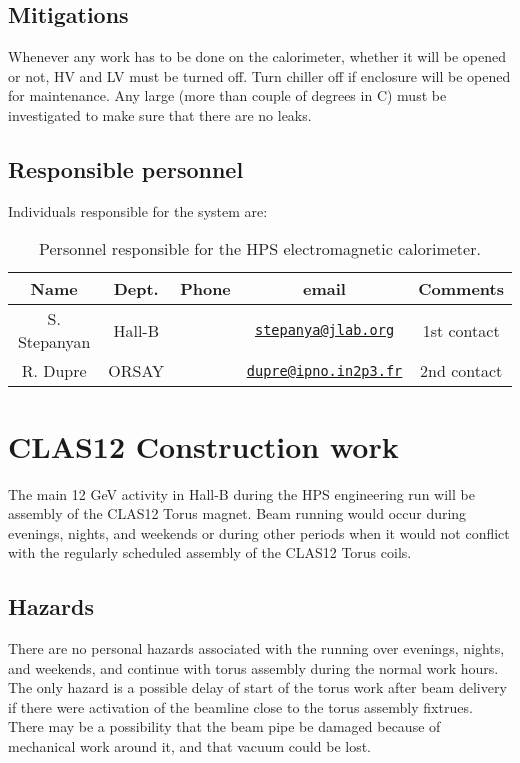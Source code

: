 \documentclass[11pt]{report}
\begin{document}
\subsection{Mitigations}
\indent

Whenever any work has to be done on the calorimeter, whether it will be opened or not, HV and LV must be turned off. Turn chiller off if enclosure will be opened for maintenance. Any large (more than couple of degrees in C) must be investigated to make sure that there are no leaks.   

\subsection{Responsible personnel}
\indent

Individuals responsible for the system are:

\begin{table}[!htb]
 \centering
 \begin{tabular}{|c|c|c|c|c|}
\hline
 Name&Dept.&Phone&email&Comments \\ \hline
 S. Stepanyan & Hall-B&&\href{mailto:stepanya@jlab.org}{\nolinkurl{stepanya@jlab.org}}&1st contact \\ \hline
 R. Dupre & ORSAY&&\href{mailto:dupre@ipno.in2p3.fr}{\nolinkurl{dupre@ipno.in2p3.fr}}& 2nd contact  \\ \hline
 \end{tabular}
\caption{Personnel responsible for the HPS electromagnetic calorimeter.} 
\label{tb:ecal}
\end{table}

\section{CLAS12 Construction work}
\indent

The main 12 GeV activity in Hall-B during the HPS engineering run will be assembly of the CLAS12 Torus magnet. Beam running would occur during evenings, nights, and weekends or during other periods when it would not conflict with the regularly scheduled assembly of the CLAS12 Torus coils.

\subsection{Hazards} 
\indent

There are no personal hazards associated with the running over evenings, nights, and weekends, and continue with torus assembly during the normal work hours. The only hazard is a possible delay of start of the torus work after beam delivery if there were activation of the beamline close to the torus assembly fixtrues. There may be a possibility that the beam pipe be damaged because of mechanical work around it, and that vacuum could be lost.  
 
\end{document}
